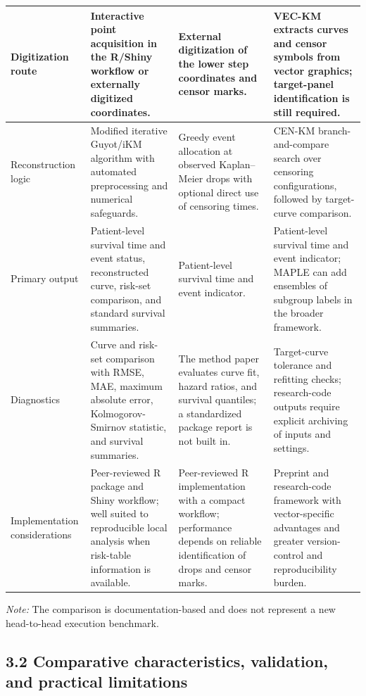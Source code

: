 \documentclass[10pt,letterpaper]{article}
\begin{document}
\begin{nolinenumbers}
\begin{longtable}{|>{\raggedright\arraybackslash}p{1.00in}|>{\raggedright\arraybackslash}p{1.98in}|>{\raggedright\arraybackslash}p{1.98in}|>{\raggedright\arraybackslash}p{2.05in}|}
Digitization route & Interactive point acquisition in the R/Shiny workflow or externally digitized coordinates. & External digitization of the lower step coordinates and censor marks. & VEC-KM extracts curves and censor symbols from vector graphics; target-panel identification is still required. \\ \hline
Reconstruction logic & Modified iterative Guyot/iKM algorithm with automated preprocessing and numerical safeguards. & Greedy event allocation at observed Kaplan--Meier drops with optional direct use of censoring times. & CEN-KM branch-and-compare search over censoring configurations, followed by target-curve comparison. \\ \hline
Primary output & Patient-level survival time and event status, reconstructed curve, risk-set comparison, and standard survival summaries. & Patient-level survival time and event indicator. & Patient-level survival time and event indicator; MAPLE can add ensembles of subgroup labels in the broader framework. \\ \hline
Diagnostics & Curve and risk-set comparison with RMSE, MAE, maximum absolute error, Kolmogorov-Smirnov statistic, and survival summaries. & The method paper evaluates curve fit, hazard ratios, and survival quantiles; a standardized package report is not built in. & Target-curve tolerance and refitting checks; research-code outputs require explicit archiving of inputs and settings. \\ \hline
Implementation considerations & Peer-reviewed R package and Shiny workflow; well suited to reproducible local analysis when risk-table information is available. & Peer-reviewed R implementation with a compact workflow; performance depends on reliable identification of drops and censor marks. & Preprint and research-code framework with vector-specific advantages and greater version-control and reproducibility burden. \\ \hline
\end{longtable}
\endgroup
\end{nolinenumbers}

\emph{Note:} The comparison is documentation-based and does not represent a new head-to-head execution benchmark.

\subsection*{3.2 Comparative characteristics, validation, and practical limitations}
\end{document}
